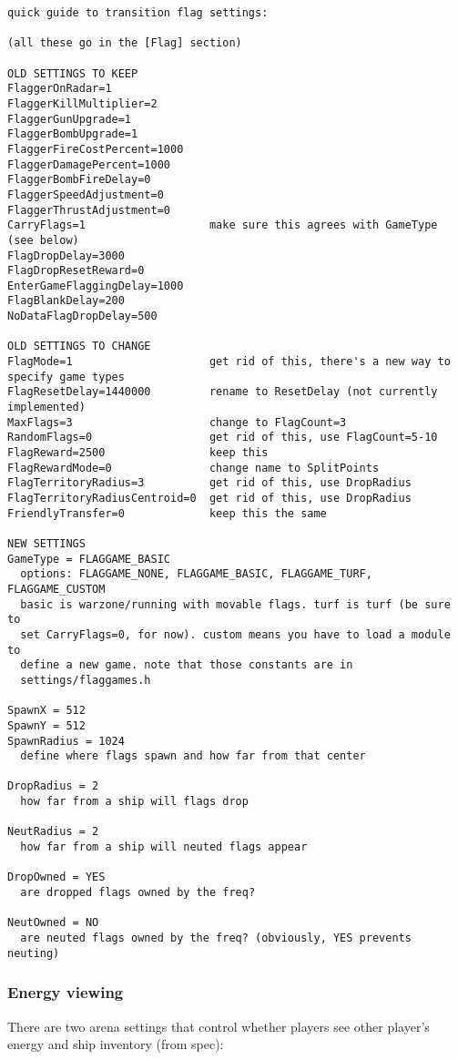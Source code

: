 \documentclass{article}
\begin{document}
\begin{verbatim}
quick guide to transition flag settings:

(all these go in the [Flag] section)

OLD SETTINGS TO KEEP
FlaggerOnRadar=1
FlaggerKillMultiplier=2
FlaggerGunUpgrade=1
FlaggerBombUpgrade=1
FlaggerFireCostPercent=1000
FlaggerDamagePercent=1000
FlaggerBombFireDelay=0
FlaggerSpeedAdjustment=0
FlaggerThrustAdjustment=0
CarryFlags=1                   make sure this agrees with GameType (see below)
FlagDropDelay=3000
FlagDropResetReward=0
EnterGameFlaggingDelay=1000
FlagBlankDelay=200
NoDataFlagDropDelay=500

OLD SETTINGS TO CHANGE
FlagMode=1                     get rid of this, there's a new way to specify game types
FlagResetDelay=1440000         rename to ResetDelay (not currently implemented)
MaxFlags=3                     change to FlagCount=3
RandomFlags=0                  get rid of this, use FlagCount=5-10
FlagReward=2500                keep this
FlagRewardMode=0               change name to SplitPoints
FlagTerritoryRadius=3          get rid of this, use DropRadius
FlagTerritoryRadiusCentroid=0  get rid of this, use DropRadius
FriendlyTransfer=0             keep this the same

NEW SETTINGS
GameType = FLAGGAME_BASIC
  options: FLAGGAME_NONE, FLAGGAME_BASIC, FLAGGAME_TURF, FLAGGAME_CUSTOM
  basic is warzone/running with movable flags. turf is turf (be sure to
  set CarryFlags=0, for now). custom means you have to load a module to
  define a new game. note that those constants are in
  settings/flaggames.h

SpawnX = 512
SpawnY = 512
SpawnRadius = 1024
  define where flags spawn and how far from that center

DropRadius = 2
  how far from a ship will flags drop

NeutRadius = 2
  how far from a ship will neuted flags appear

DropOwned = YES
  are dropped flags owned by the freq?

NeutOwned = NO
  are neuted flags owned by the freq? (obviously, YES prevents neuting)
\end{verbatim}


\subsubsection{Energy viewing}

There are two arena settings that control whether players see other
player's energy and ship inventory (from spec):
\end{document}
